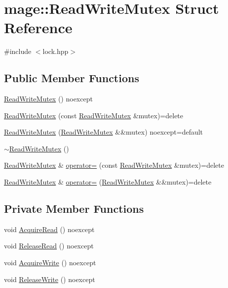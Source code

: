 \hypertarget{structmage_1_1_read_write_mutex}{}\section{mage\+:\+:Read\+Write\+Mutex Struct Reference}
\label{structmage_1_1_read_write_mutex}


{\ttfamily \#include $<$lock.\+hpp$>$}

\subsection*{Public Member Functions}
\begin{DoxyCompactItemize}
\item 
\hyperlink{structmage_1_1_read_write_mutex_aa206018373d39aef48b6e465909a75a5}{Read\+Write\+Mutex} () noexcept
\item 
\hyperlink{structmage_1_1_read_write_mutex_aacb2f69e7e2b084147e1e45628e9dd67}{Read\+Write\+Mutex} (const \hyperlink{structmage_1_1_read_write_mutex}{Read\+Write\+Mutex} \&mutex)=delete
\item 
\hyperlink{structmage_1_1_read_write_mutex_a35e15c17527ef771920129c4e381eb17}{Read\+Write\+Mutex} (\hyperlink{structmage_1_1_read_write_mutex}{Read\+Write\+Mutex} \&\&mutex) noexcept=default
\item 
\hyperlink{structmage_1_1_read_write_mutex_a73676d9414658d63edfe443ee1d55c8b}{$\sim$\+Read\+Write\+Mutex} ()
\item 
\hyperlink{structmage_1_1_read_write_mutex}{Read\+Write\+Mutex} \& \hyperlink{structmage_1_1_read_write_mutex_a408e06f3c8bcc644e43afbf7e9ac772f}{operator=} (const \hyperlink{structmage_1_1_read_write_mutex}{Read\+Write\+Mutex} \&mutex)=delete
\item 
\hyperlink{structmage_1_1_read_write_mutex}{Read\+Write\+Mutex} \& \hyperlink{structmage_1_1_read_write_mutex_a14ea4d1be75046741a7663e0d86a017a}{operator=} (\hyperlink{structmage_1_1_read_write_mutex}{Read\+Write\+Mutex} \&\&mutex)=delete
\end{DoxyCompactItemize}
\subsection*{Private Member Functions}
\begin{DoxyCompactItemize}
\item 
void \hyperlink{structmage_1_1_read_write_mutex_add04196fda61967f81901bcba79938bc}{Acquire\+Read} () noexcept
\item 
void \hyperlink{structmage_1_1_read_write_mutex_a4fbd8ad3d47e07307c31a4e212305744}{Release\+Read} () noexcept
\item 
void \hyperlink{structmage_1_1_read_write_mutex_ab99adb4241990fa0dd2d3ba03322d1c3}{Acquire\+Write} () noexcept
\item 
void \hyperlink{structmage_1_1_read_write_mutex_ad520a65bee5a8ac04671ee93895d9b28}{Release\+Write} () noexcept
\end{DoxyCompactItemize}
